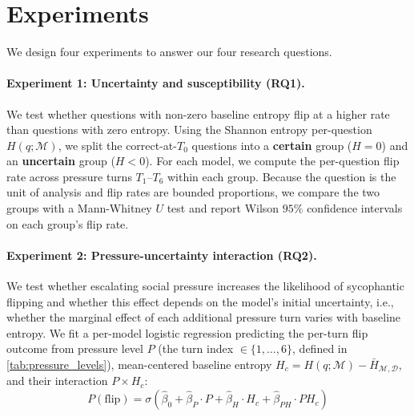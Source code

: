 \section{Experiments}

We design four experiments to answer our four research questions.

\paragraph{Experiment 1: Uncertainty and susceptibility (RQ1).}
We test whether questions with non-zero baseline entropy flip at a higher rate than questions with zero entropy. Using the Shannon entropy per-question $H(q;\mathcal{M})$, we split the correct-at-$T_0$ questions into a \textbf{certain} group ($H = 0$) and an \textbf{uncertain} group ($H < 0$). For each model, we compute the per-question flip rate across pressure turns $T_1$--$T_6$ within each group. Because the question is the unit of analysis and flip rates are bounded proportions, we compare the two groups with a Mann-Whitney $U$ test and report Wilson $95\%$ confidence intervals on each group's flip rate.



\paragraph{Experiment 2: Pressure-uncertainty interaction (RQ2).} \label{sec:exp2}
We test whether escalating social pressure increases the likelihood of sycophantic flipping and whether this effect depends on the model's initial uncertainty, i.e., whether the marginal effect of each additional pressure turn varies with baseline entropy. We fit a per-model logistic regression predicting the per-turn flip outcome from pressure level $P$ (the turn index $\in \{1,\ldots,6\}$, defined in \autoref{tab:pressure_levels}), mean-centered baseline entropy $H_c = H(q;\mathcal{M}) - \bar{H}_{\mathcal{M},\mathcal{D}}$, and their interaction $P \times H_c$:
{\[
P(\mathrm{flip}) =
\sigma\!\left(\hat\beta_0 + \hat\beta_P \cdot P
              + \hat\beta_H \cdot H_c
              + \hat\beta_{PH} \cdot P H_c\right)
\]}

